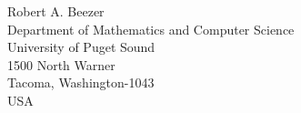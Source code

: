 Robert A. Beezer\\
Department of Mathematics and Computer Science\\
University of Puget Sound\\
1500 North Warner\\
Tacoma, Washington-1043\\
USA
